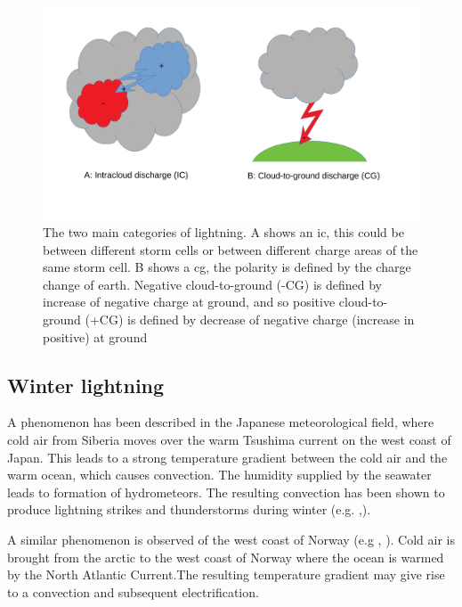 \begin{figure}
    \centering
    \includegraphics[width=\textwidth]{Figures/lyntyper.pdf}
    \caption{The two main categories of lightning. A shows an \acrfull{ic}, this could be between different storm cells or between different charge areas of the same storm cell. B shows a \acrfull{cg}, the polarity is defined by the charge change of earth. Negative cloud-to-ground (-CG) is defined by increase of negative charge at ground, and so positive cloud-to-ground (+CG) is defined by decrease of negative charge (increase in positive) at ground}
    \label{fig:lyntyper}
\end{figure}


\subsection{Winter lightning}
A phenomenon has been described in the Japanese meteorological field, where cold air from Siberia moves over the warm Tsushima current on the west coast of Japan. This leads to a strong temperature gradient between the cold air and the warm ocean, which causes convection. The  humidity supplied by the seawater leads to formation of hydrometeors. The resulting convection has been shown to produce lightning strikes and thunderstorms during winter (e.g. \cite{goto},\cite{michimoto2007}).

A similar phenomenon is observed of the west coast of Norway (e.g \cite{koeltzow2018}, \cite{montanya2016}). Cold air is brought from the arctic to the west coast of Norway where the ocean is warmed by the North Atlantic Current.The resulting temperature gradient may give rise to a convection and subsequent electrification.
 
